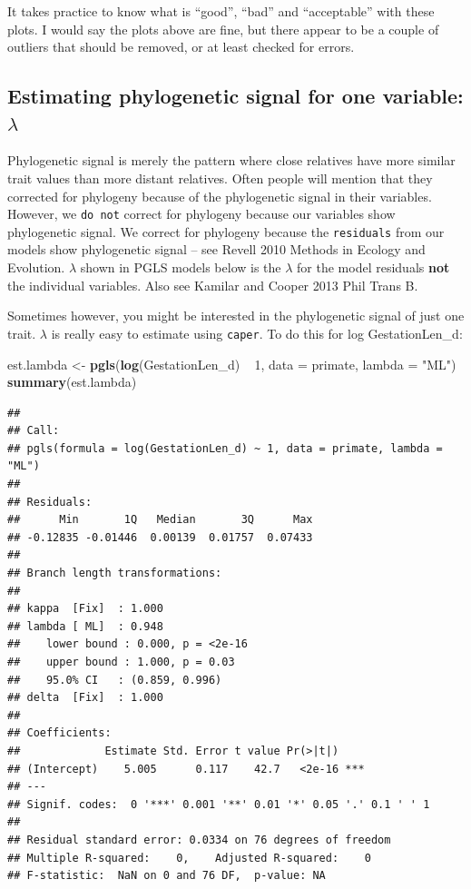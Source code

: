 \documentclass[12pt]{article}
\newcommand{\KeywordTok}[1]{\textcolor[rgb]{0.13,0.29,0.53}{\textbf{{#1}}}}
\newcommand{\DataTypeTok}[1]{\textcolor[rgb]{0.13,0.29,0.53}{{#1}}}
\newcommand{\DecValTok}[1]{\textcolor[rgb]{0.00,0.00,0.81}{{#1}}}
\newcommand{\StringTok}[1]{\textcolor[rgb]{0.31,0.60,0.02}{{#1}}}
\newcommand{\NormalTok}[1]{{#1}}
\begin{document}
It takes practice to know what is ``good'', ``bad'' and ``acceptable'' with these plots. I would say the plots above are fine, but there appear to be a couple of outliers that should be removed, or at least checked for errors. 

\subsection{Estimating phylogenetic signal for one variable: $\lambda$}
Phylogenetic signal is merely the pattern where close relatives have more similar trait values than more distant relatives. Often people will mention that they corrected for phylogeny because of the phylogenetic signal in their variables. However, we \texttt{do not} correct for phylogeny because our variables show phylogenetic signal. We correct for phylogeny because the \texttt{residuals} from our models show phylogenetic signal – see Revell 2010 Methods in Ecology and Evolution. $\lambda$ shown in PGLS models below is the $\lambda$ for the model residuals \textbf{not} the individual variables. Also see Kamilar and Cooper 2013 Phil Trans B.

Sometimes however, you might be interested in the phylogenetic signal of just one trait. $\lambda$ is really easy to estimate using \texttt{caper}. To do this for log GestationLen\_d:

\begin{snugshade}
\begin{Highlighting}[]
\NormalTok{est.lambda <-}\StringTok{ }\KeywordTok{pgls}\NormalTok{(}\KeywordTok{log}\NormalTok{(GestationLen_d) ~}\StringTok{ }\DecValTok{1}\NormalTok{, }\DataTypeTok{data =} \NormalTok{primate, }\DataTypeTok{lambda =} \StringTok{"ML"}\NormalTok{)}
\KeywordTok{summary}\NormalTok{(est.lambda)}
\end{Highlighting}
\end{snugshade}

\begin{verbatim}
## 
## Call:
## pgls(formula = log(GestationLen_d) ~ 1, data = primate, lambda = "ML")
## 
## Residuals:
##      Min       1Q   Median       3Q      Max 
## -0.12835 -0.01446  0.00139  0.01757  0.07433 
## 
## Branch length transformations:
## 
## kappa  [Fix]  : 1.000
## lambda [ ML]  : 0.948
##    lower bound : 0.000, p = <2e-16
##    upper bound : 1.000, p = 0.03 
##    95.0% CI   : (0.859, 0.996)
## delta  [Fix]  : 1.000
## 
## Coefficients:
##             Estimate Std. Error t value Pr(>|t|)    
## (Intercept)    5.005      0.117    42.7   <2e-16 ***
## ---
## Signif. codes:  0 '***' 0.001 '**' 0.01 '*' 0.05 '.' 0.1 ' ' 1
## 
## Residual standard error: 0.0334 on 76 degrees of freedom
## Multiple R-squared:    0,    Adjusted R-squared:    0 
## F-statistic:  NaN on 0 and 76 DF,  p-value: NA
\end{verbatim}
\end{document}
